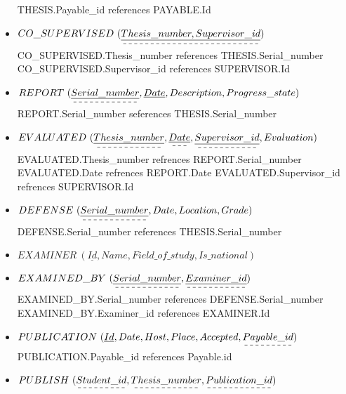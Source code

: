 \documentclass[a4paper]{article}
\begin{document}
\begin{itemize}
    \newline THESIS.Payable\_id references PAYABLE.Id
    \newline
\item$CO\_SUPERVISED \ (\dashuline{\underline{Thesis\_number,Supervisor\_id}})$
    \newline CO\_SUPERVISED.Thesis\_number references THESIS.Serial\_number
    \newline CO\_SUPERVISED.Supervisor\_id references SUPERVISOR.Id 
\newline        
\item$ REPORT \ (\dashuline{\underline{Serial\_number}}, \underline{Date}, Description, Progress\_state)$
    \newline REPORT.Serial\_number seferences THESIS.Serial\_number
\newline    
\item$EVALUATED \ (\dashuline{\underline{Thesis\_number}}, \dashuline{\underline{Date}}, \dashuline{\underline{Supervisor\_id}}, Evaluation)$
    \newline EVALUATED.Thesis\_number refrences  REPORT.Serial\_number
    \newline EVALUATED.Date refrences REPORT.Date
    \newline EVALUATED.Supervisor\_id refrences SUPERVISOR.Id 
\newline    
\item$DEFENSE \ (\dashuline{\underline{Serial\_number}}, Date , Location , Grade )$
    \newline DEFENSE.Serial\_number references THESIS.Serial\_number
   \newline
\item$EXAMINER \ (\underline{Id}, Name , Field\_of\_study , Is\_national)$
\newline
\item$ EXAMINED\_BY \ (\dashuline{\underline{Serial\_number}}, \dashuline{\underline{Examiner\_id}})$
    \newline EXAMINED\_BY.Serial\_number references DEFENSE.Serial\_number
    \newline EXAMINED\_BY.Examiner\_id references EXAMINER.Id
\newline
\item$ PUBLICATION \ (\underline{Id}, Date, Host, Place, Accepted, \dashuline{Payable\_id})$
    \newline PUBLICATION.Payable\_id references Payable.id 
\newline  
\item$ PUBLISH \ (\dashuline{Student\_id}, \dashuline{Thesis\_number}, \dashuline{Publication\_id})$  

\end{itemize}
\end{document}
